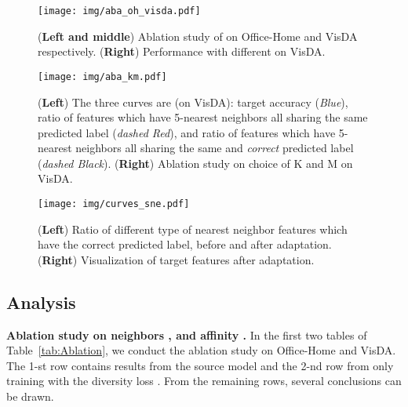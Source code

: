 \documentclass{article}
\begin{document}
\begin{figure*}[t]
	\centering
	\texttt{[image: img/aba\_oh\_visda.pdf]}
	\vspace{-2mm}
	\caption{(\textbf{Left and middle}) Ablation study of  on Office-Home and VisDA respectively. (\textbf{Right}) Performance with different  on VisDA. \vspace{-2mm}}
	\label{fig:abas}
	\vspace{-2mm}
\end{figure*}


\begin{figure*}[t]
	\centering
	\texttt{[image: img/aba\_km.pdf]}
	\vspace{-2mm}
	\caption{(\textbf{Left}) The three curves are (on VisDA): target accuracy (\textit{Blue}), ratio of features which have 5-nearest neighbors all sharing the same predicted label (\textit{dashed Red}), and ratio of features which have 5-nearest neighbors all sharing the same and \textit{correct} predicted label (\textit{dashed Black}). (\textbf{Right}) Ablation study on choice of K and M on VisDA. \vspace{-2mm}}
	\label{fig:curve_km}
	\vspace{-2mm}
\end{figure*}







\begin{figure*}[bpt]
	\centering
\texttt{[image: img/curves\_sne.pdf]}
	\vspace{-2mm}
	\caption{(\textbf{Left}) Ratio of different type of nearest neighbor features which have the correct predicted label, before and after adaptation. (\textbf{Right}) Visualization of target features after adaptation.\vspace{-2mm}}
	\label{fig:curves_sne}
	\vspace{-2mm}
\end{figure*}


\subsection{Analysis}

\noindent \textbf{Ablation study on neighbors ,  and affinity .} In the first two tables of Table~\ref{tab:Ablation}, we conduct the ablation study on Office-Home and VisDA. The 1-st row contains results from the source model and the 2-nd row from only training with the diversity loss . From the remaining rows, several conclusions can be drawn.
\end{document}
